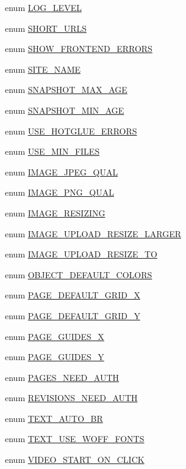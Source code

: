 \begin{DoxyCompactItemize}
enum \hyperlink{config_8inc_8php_aa5a9053636a30269210c54e734e0d583}{LOG\_\-LEVEL} 
\item 
enum \hyperlink{config_8inc_8php_a377ac3321785e25215435e8d9802bc34}{SHORT\_\-URLS} 
\item 
enum \hyperlink{config_8inc_8php_a71022f94adb600e3984795805fe7f8d0}{SHOW\_\-FRONTEND\_\-ERRORS} 
\item 
enum \hyperlink{config_8inc_8php_a38f8e1265350d7091b55f4cffe629f3a}{SITE\_\-NAME} 
\item 
enum \hyperlink{config_8inc_8php_aa9c8d739795b1000f6ea105992a4e488}{SNAPSHOT\_\-MAX\_\-AGE} 
\item 
enum \hyperlink{config_8inc_8php_a7fb94ff6aaa61e964fe2f90f738d5cb3}{SNAPSHOT\_\-MIN\_\-AGE} 
\item 
enum \hyperlink{config_8inc_8php_a4be2ca4abd0486feb76708f3cf7e671d}{USE\_\-HOTGLUE\_\-ERRORS} 
\item 
enum \hyperlink{config_8inc_8php_a98806af9de0ea41a958d26c7e06b26a9}{USE\_\-MIN\_\-FILES} 
\item 
enum \hyperlink{config_8inc_8php_af27e0280ef96e9b1d2d968a0d2d208ff}{IMAGE\_\-JPEG\_\-QUAL} 
\item 
enum \hyperlink{config_8inc_8php_a3e161cc5c717f2e23d89b69ec297af9b}{IMAGE\_\-PNG\_\-QUAL} 
\item 
enum \hyperlink{config_8inc_8php_a0654894e46ca07417a6e85e091ed7d1d}{IMAGE\_\-RESIZING} 
\item 
enum \hyperlink{config_8inc_8php_a009a803b2fcec74eb8fd6b90dfebd680}{IMAGE\_\-UPLOAD\_\-RESIZE\_\-LARGER} 
\item 
enum \hyperlink{config_8inc_8php_a86484d4f8051155268e7c23ac4d1f5f4}{IMAGE\_\-UPLOAD\_\-RESIZE\_\-TO} 
\item 
enum \hyperlink{config_8inc_8php_a3e205a45d91d7ef191e53487b6b48b3b}{OBJECT\_\-DEFAULT\_\-COLORS} 
\item 
enum \hyperlink{config_8inc_8php_abc1c54acdbce897c718854b663517cf9}{PAGE\_\-DEFAULT\_\-GRID\_\-X} 
\item 
enum \hyperlink{config_8inc_8php_ab93c5dcea5ef58747b80594c3d9304d7}{PAGE\_\-DEFAULT\_\-GRID\_\-Y} 
\item 
enum \hyperlink{config_8inc_8php_a81167deb206874270a59273141919fe5}{PAGE\_\-GUIDES\_\-X} 
\item 
enum \hyperlink{config_8inc_8php_a3f78eb981e05f649bfff403c0e595d0b}{PAGE\_\-GUIDES\_\-Y} 
\item 
enum \hyperlink{config_8inc_8php_a11f5534165e1764860b16cc7215b2141}{PAGES\_\-NEED\_\-AUTH} 
\item 
enum \hyperlink{config_8inc_8php_a67b9479d334a4e6c33c0bc3505b3eb5e}{REVISIONS\_\-NEED\_\-AUTH} 
\item 
enum \hyperlink{config_8inc_8php_a6f581226f389510394c592491ebedc0b}{TEXT\_\-AUTO\_\-BR} 
\item 
enum \hyperlink{config_8inc_8php_aca83853e44d4952801b133bf687a1056}{TEXT\_\-USE\_\-WOFF\_\-FONTS} 
\item 
enum \hyperlink{config_8inc_8php_ae1e42e1baa41f003453356a3747f9fee}{VIDEO\_\-START\_\-ON\_\-CLICK} 
\end{DoxyCompactItemize}
